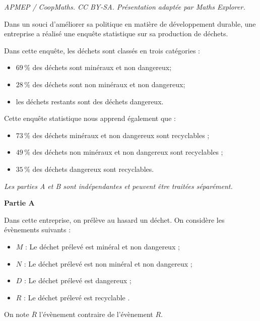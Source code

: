 \documentclass[10pt]{article}
\begin{document}
\noindent\textit{APMEP / CoopMaths. CC BY-SA. Présentation adaptée par Maths Explorer.}\par\medskip
\medskip

Dans un souci d'améliorer sa politique en matière de développement durable, une entreprise a réalisé une enquête statistique sur sa production de déchets.

Dans cette enquête, les déchets sont classés en trois catégories :

\begin{itemize}
\item $69\,\%$ des déchets sont minéraux et non dangereux;
\item $28\,\%$ des déchets sont non minéraux et non dangereux;
\item les déchets restants sont des déchets dangereux.
\end{itemize}

Cette enquête statistique nous apprend également que :

\begin{itemize}
\item $73\,\%$ des déchets minéraux et non dangereux sont recyclables ;
\item $49\,\%$ des déchets non minéraux et non dangereux sont recyclables ;
\item $35\,\%$ des déchets dangereux sont recyclables.
\end{itemize}

\emph{Les parties {\rm A} et {\rm B} sont indépendantes et peuvent être traitées séparément.}

\medskip

\textbf{Partie A}

\medskip

Dans cette entreprise, on prélève au hasard un déchet. On considère les évènements suivants :

\begin{itemize}
\item $M$ : \og Le déchet prélevé est minéral et non dangereux \fg{} ;
\item $N$ : \og Le déchet prélevé est non minéral et non dangereux \fg{};
\item $D$ : \og Le déchet prélevé est dangereux \fg{};
\item $R$ : \og Le déchet prélevé est recyclable \fg.
\end{itemize}

On note $\overline{R}$ l'évènement contraire de l'évènement $R$.
\end{document}
